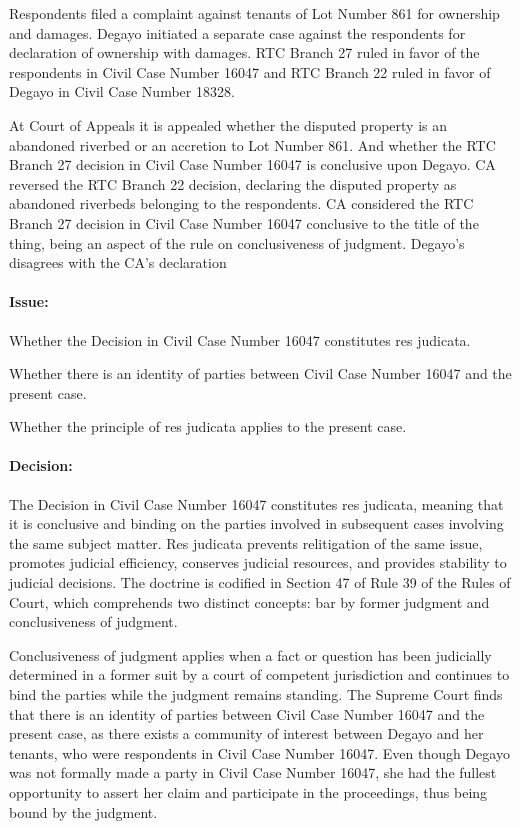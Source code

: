 \documentclass[
12pt,
oneside,
onehalfspacing,
headsepline
]{DigestCollection}
\begin{document}
Respondents filed a complaint against tenants of Lot Number 861 for ownership and damages. Degayo initiated a separate case against the respondents for declaration of ownership with damages. RTC Branch 27 ruled in favor of the respondents in Civil Case Number 16047 and RTC Branch 22 ruled in favor of Degayo in Civil Case Number 18328.

At Court of Appeals it is appealed whether the disputed property is an abandoned riverbed or an accretion to Lot Number 861. And whether the RTC Branch 27 decision in Civil Case Number 16047 is conclusive upon Degayo. CA reversed the RTC Branch 22 decision, declaring the disputed property as abandoned riverbeds belonging to the respondents. CA considered the RTC Branch 27 decision in Civil Case Number 16047 conclusive to the title of the thing, being an aspect of the rule on conclusiveness of judgment. Degayo's disagrees with the CA's declaration

\paragraph{Issue:}
\label{25e76b40-1258-11ef-aa24-9916ea601717}


Whether the Decision in Civil Case Number 16047 constitutes res judicata.

Whether there is an identity of parties between Civil Case Number 16047 and the present case.

Whether the principle of res judicata applies to the present case.

\paragraph{Decision:}
\label{23a8c5e0-1258-11ef-aa24-9916ea601717}


The Decision in Civil Case Number 16047 constitutes res judicata, meaning that it is conclusive and binding on the parties involved in subsequent cases involving the same subject matter. Res judicata prevents relitigation of the same issue, promotes judicial efficiency, conserves judicial resources, and provides stability to judicial decisions. The doctrine is codified in Section 47 of Rule 39 of the Rules of Court, which comprehends two distinct concepts: bar by former judgment and conclusiveness of judgment.

Conclusiveness of judgment applies when a fact or question has been judicially determined in a former suit by a court of competent jurisdiction and continues to bind the parties while the judgment remains standing. The Supreme Court finds that there is an identity of parties between Civil Case Number 16047 and the present case, as there exists a community of interest between Degayo and her tenants, who were respondents in Civil Case Number 16047. Even though Degayo was not formally made a party in Civil Case Number 16047, she had the fullest opportunity to assert her claim and participate in the proceedings, thus being bound by the judgment.
\end{document}
